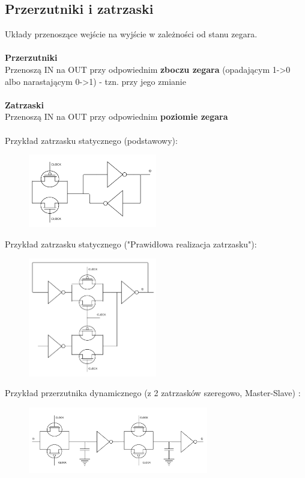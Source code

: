 \documentclass[10pt,a4paper]{article}
\begin{document}
\subsection{Przerzutniki i zatrzaski}
Układy przenoszące wejście na wyjście w zależności od stanu zegara.\\
\\
\textbf{Przerzutniki} \\
Przenoszą IN na OUT przy odpowiednim \textbf{zboczu zegara} (opadającym 1->0 albo narastającym 0->1) - tzn. przy jego zmianie\\
\\
\textbf{Zatrzaski} \\
Przenoszą IN na OUT przy odpowiednim \textbf{poziomie zegara} \\
\\
Przykład zatrzasku statycznego (podstawowy):
\begin{figure}[H]
\centering
\includegraphics[width=0.5\textwidth]{zatrzask_stat_1.png}
\end{figure}
Przykład zatrzasku statycznego ("Prawidłowa realizacja zatrzasku"):
\begin{figure}[H]
\centering
\includegraphics[width=0.5\textwidth]{zatrzask_stat_2.png}
\end{figure}

Przykład przerzutnika dynamicznego (z 2 zatrzasków szeregowo, Master-Slave) :
\begin{figure}[H]
\centering
\includegraphics[width=0.7\textwidth]{przerzutnik_dyn_1.png}
\end{figure}
\end{document}
